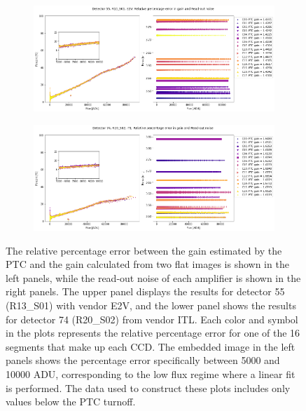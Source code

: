  \begin{figure}[!htb]
     \centering
     \begin{subfigure}[b]{\textwidth}
         \centering
         \includegraphics[width=\textwidth]{Figures/Relative_Error_Gain_Noise_detectorR13_S01_old.png}
     \end{subfigure}
     \vspace{3mm}
     \begin{subfigure}[b]{\textwidth}
         \centering
         \includegraphics[width=\textwidth]{Figures/Relative_Error_Gain_Noise_detectorR20_S02_old.png}
     \end{subfigure}
        \caption{The relative percentage error between the gain estimated by the PTC and the gain calculated from two flat images is shown in the left panels, while the read-out noise of each amplifier is shown in the right panels. The upper panel displays the results for detector 55 (R13\_S01) with vendor E2V, and the lower panel shows the results for detector 74 (R20\_S02) from vendor ITL. Each color and symbol in the plots represents the relative percentage error for one of the 16 segments that make up each CCD. The embedded image in the left panels shows the percentage error specifically between 5000 and 10000 ADU, corresponding to the low flux regime where a linear fit is performed. The data used to construct these plots includes only values below the PTC turnoff.}
        \label{fig:relative_error_oldcode}
\end{figure}


